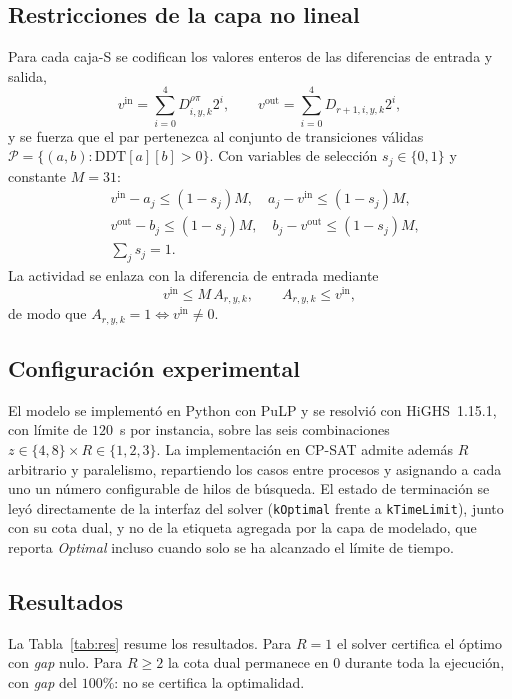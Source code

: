 \documentclass[conference]{IEEEtran}
\begin{document}
\subsection{Restricciones de la capa no lineal}

Para cada caja-S se codifican los valores enteros de las diferencias de entrada y salida,
\begin{equation}
v^{\mathrm{in}}=\sum_{i=0}^{4} D^{\rho\pi}_{i,y,k}2^{i},\qquad
v^{\mathrm{out}}=\sum_{i=0}^{4} D_{r+1,i,y,k}2^{i},
\end{equation}
y se fuerza que el par pertenezca al conjunto de transiciones válidas
$\mathcal{P}=\{(a,b):\mathrm{DDT}[a][b]>0\}$. Con variables de selección
$s_j\in\{0,1\}$ y constante $M=31$:
\begin{align}
&v^{\mathrm{in}}-a_j\le(1-s_j)M, \quad a_j-v^{\mathrm{in}}\le(1-s_j)M,\\
&v^{\mathrm{out}}-b_j\le(1-s_j)M, \quad b_j-v^{\mathrm{out}}\le(1-s_j)M,\\
&\textstyle\sum_j s_j=1.
\end{align}
La actividad se enlaza con la diferencia de entrada mediante
\begin{equation}
v^{\mathrm{in}}\le M\,A_{r,y,k},\qquad A_{r,y,k}\le v^{\mathrm{in}},
\end{equation}
de modo que $A_{r,y,k}=1\iff v^{\mathrm{in}}\neq0$.

\subsection{Configuración experimental}

El modelo se implementó en Python con PuLP y se resolvió con HiGHS~1.15.1, con límite de
$120$~s por instancia, sobre las seis combinaciones $z\in\{4,8\}\times R\in\{1,2,3\}$. La
implementación en CP-SAT admite además $R$ arbitrario y paralelismo, repartiendo los casos
entre procesos y asignando a cada uno un número configurable de hilos de búsqueda. El
estado de terminación se leyó directamente de la interfaz del solver
(\texttt{kOptimal} frente a \texttt{kTimeLimit}), junto con su cota dual, y no de la
etiqueta agregada por la capa de modelado, que reporta \emph{Optimal} incluso cuando solo
se ha alcanzado el límite de tiempo.

\subsection{Resultados}

La Tabla~\ref{tab:res} resume los resultados. Para $R=1$ el solver certifica el óptimo
con \emph{gap} nulo. Para $R\ge2$ la cota dual permanece en $0$ durante toda la
ejecución, con \emph{gap} del $100\%$: no se certifica la optimalidad.
\end{document}
